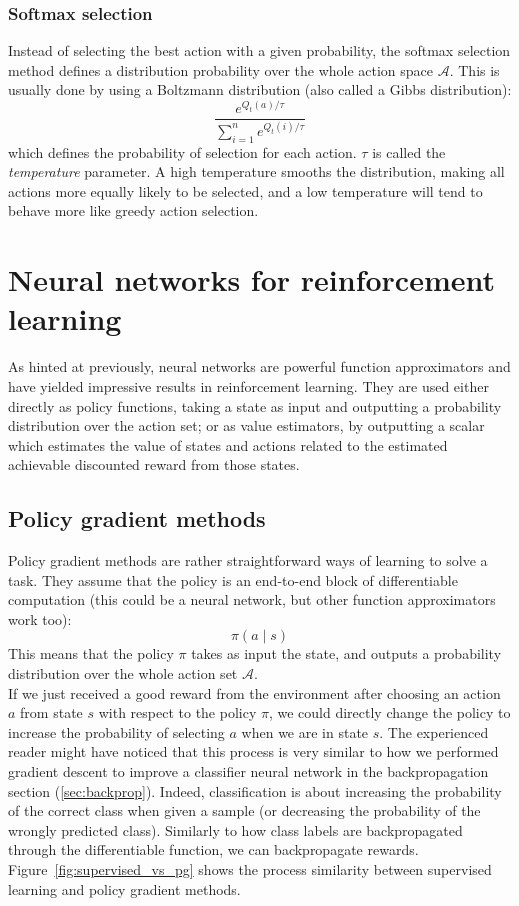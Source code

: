 \subsubsection{Softmax selection}
Instead of selecting the best action with a given probability, the 
softmax selection method defines a distribution probability over the whole
action space $\mathcal{A}$. This is usually done by using a Boltzmann distribution
(also called a Gibbs distribution):
$$ \frac{e^{Q_t(a)/\tau}}{\sum_{i=1}^{n}e^{Q_t(i)/\tau}} $$
which defines the probability of selection for each action. $\tau$ is called
the \textit{temperature} parameter. A high temperature smooths the distribution,
making all actions more equally likely to be selected, and a low temperature
will tend to behave more like greedy action selection.

\section{Neural networks for reinforcement learning}
As hinted at previously, neural networks are powerful function approximators and
have yielded impressive results in reinforcement learning. They are used either
directly as policy functions, taking a state as input and outputting a
probability distribution over the action set; or as value estimators, by 
outputting a scalar which estimates the value of states and actions related to the
estimated achievable discounted reward from those states.

\subsection{Policy gradient methods}
Policy gradient methods are rather straightforward ways of learning to solve a task.
They assume that the policy is an end-to-end block of differentiable computation
(this could be a neural network, but other function approximators work too):
$$\pi(a \mid s)$$
This means that the policy $\pi$ takes as input the state, and outputs a 
probability distribution over the whole action set $\mathcal{A}$.\\

If we just received a good reward from the environment after choosing an action
$a$ from state $s$
with respect to the policy $\pi$, we could directly change the policy to 
increase the probability of selecting $a$ when we are in state $s$. The
experienced reader might have noticed that this process is very similar to
how we performed gradient descent to improve a classifier neural network in
the backpropagation section (\ref{sec:backprop}).
Indeed, classification is about increasing the probability of the correct
class when given a sample (or decreasing the probability of the wrongly
predicted class). Similarly to how class labels are backpropagated through
the differentiable function, we can backpropagate rewards.
Figure~\ref{fig:supervised_vs_pg} shows the process similarity between 
supervised learning and policy gradient methods.\\


